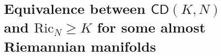 \documentclass[11pt,twoside,a4paper]{article}
\newcommand*\diff{\mathop{}\!\mathrm{d}}
\newcommand{\R}{\mathbb{R}}
\newcommand{\g}{\mathrm{g}}
\newcommand{\vol}{\mathrm{dvol}}
\newcommand{\cd}{\mathsf{CD}}
\newcommand{\Ric}{\mathrm{Ric}}
\newcommand{\m}{\mathfrak m} %
\newcommand{\Splu}{\mathbb{S}_+}
\theoremstyle{theorem}
\newtheorem{lemma}[theorem]{Lemma}
\theoremstyle{definition}
\theoremstyle{remark}
\theoremstyle{proof}
\begin{document}



\section{Equivalence between \texorpdfstring{$\cd(K,N)$}{CD(K,N)} and \texorpdfstring{$\Ric_N\geq K$}{RicN>=K} for some almost Riemannian manifolds}
\label{section:equivalence}






\end{document}
